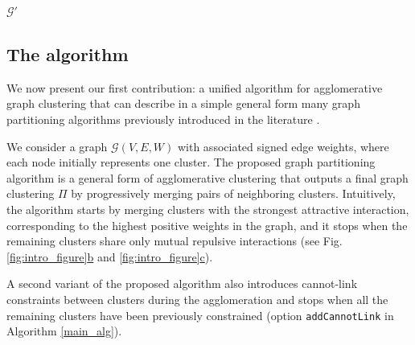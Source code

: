 \begin{algorithm}
\begin{algorithmic}[1]
      \State
      \State
      \Return $\mathcal{G}'$



  \end{algorithmic}
  \label{main_alg}
\end{algorithm}


\subsection{The algorithm} \label{sec:algorithm}

We now present our first contribution: a unified algorithm for agglomerative graph clustering that can describe in a simple general form many graph partitioning algorithms previously introduced in the literature .

We consider a graph $\mathcal{G}(V,E,W)$ with associated signed edge weights, where each node initially represents one cluster.
The proposed graph partitioning algorithm is a general form of agglomerative clustering that outputs a final graph clustering $\Pi$ by progressively merging pairs of neighboring clusters. Intuitively, the algorithm starts by merging clusters with the strongest attractive interaction, corresponding to the highest positive weights in the graph, and it stops when the remaining clusters share only mutual repulsive interactions (see Fig. \hyperref[fig:intro_figure]{\ref*{fig:intro_figure}b} and \hyperref[fig:intro_figure]{\ref*{fig:intro_figure}c}). 

A second variant of the proposed algorithm also introduces cannot-link constraints between clusters during the agglomeration and stops when all the remaining clusters have been previously constrained (option \texttt{addCannotLink} in Algorithm \ref{main_alg}).



